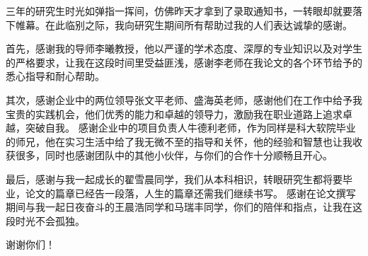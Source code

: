 
\begin{acknowledgements}

三年的研究生时光如弹指一挥间，仿佛昨天才拿到了录取通知书，一转眼却就要落下帷幕。在此临别之际，我向研究生期间所有帮助过我的人们表达诚挚的感谢。

首先，感谢我的导师李曦教授，他以严谨的学术态度、深厚的专业知识以及对学生的严格要求，让我在这段时间里受益匪浅，感谢李老师在我论文的各个环节给予的悉心指导和耐心帮助。

其次，感谢企业中的两位领导张文平老师、盛海英老师，感谢他们在工作中给予我宝贵的实践机会，他们优秀的能力和卓越的领导力，激励我在职业道路上追求卓越，突破自我。
感谢企业中的项目负责人牛德利老师，作为同样是科大软院毕业的师兄，他在实习生活中给了我无微不至的指导和关怀，他的经验和智慧也让我收获很多，同时也感谢团队中的其他小伙伴，与你们的合作十分顺畅且开心。

最后，感谢与我一起成长的翟雪晨同学，我们从本科相识，转眼研究生都将要毕业，论文的篇章已经告一段落，人生的篇章还需我们继续书写。
感谢在论文撰写期间与我一起日夜奋斗的王晨浩同学和马瑞丰同学，你们的陪伴和指点，让我在这段时光不会孤独。

谢谢你们！

\end{acknowledgements}
